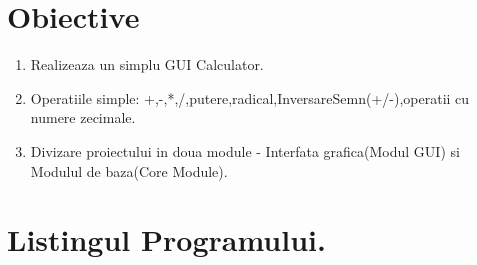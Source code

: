 \documentclass[11pt]{article}
\begin{document}
\section{Obiective}
\begin{enumerate}
\item Realizeaza un simplu GUI Calculator.
\item Operatiile simple: +,-,*,/,putere,radical,InversareSemn(+/-),operatii cu numere zecimale.
\item Divizare proiectului in doua module - Interfata grafica(Modul GUI) si Modulul de baza(Core Module).
\end{enumerate}

\section{Listingul Programului.}
\end{document}
